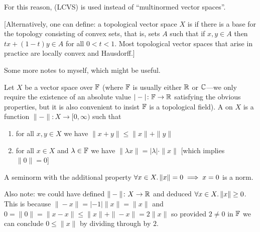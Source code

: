 \begin{remark}
For this reason,  (LCVS) is used
instead of ``multinormed vector spaces''.

[Alternatively, one can define: a topological vector space $X$
is  if there is a base for the topology
consisting of convex sets, that is, sets $A$ such that if $x,y\in A$
then $tx+(1-t)y\in A$ for all $0<t<1$. Most topological vector spaces
that arise in practice are locally convex and Hausdorff.]
\end{remark}

\begin{framed}
Some more notes to myself, which might be useful.

\begin{definition}
Let $X$ be a vector space over $\mathbb{F}$ (where $\mathbb{F}$ is usually either
$\mathbb{R}$ or $\mathbb{C}$---we only require the existence of an absolute value
$|-|\colon\mathbb{F}\to\mathbb{R}$ satisfying the obvious properties, but it is also
convenient to insist $\mathbb{F}$ is a topological field).
A  on $X$ is a function $\|-\|\colon X\to[0,\infty)$
such that
\begin{enumerate}
\item for all $x,y\in X$ we have $\|x+y\|\leq\|x\|+\|y\|$
\item for all $x\in X$ and $\lambda\in\mathbb{F}$ we have $\|\lambda x\|=|\lambda|\cdot\|x\|$
[which implies $\|0\|=0$]
\end{enumerate}
A seminorm with the additional property $\forall x\in X\ldotp \|x\|=0\implies x=0$
is a norm.
\end{definition}

\begin{node}
Also note: we could have defined $\|-\|\colon X\to\mathbb{R}$ and deduced
  $\forall x\in X\ldotp\|x\|\geq0$. This is because
  $\|-x\|=|-1|\|x\|=\|x\|$ and
  $0=\|0\|=\|x-x\|\leq\|x\|+\|-x\|=2\|x\|$ so provided $2\neq0$ in
  $\mathbb{F}$ we can conclude $0\leq\|x\|$ by dividing through by $2$.
\end{node}


\end{framed}
